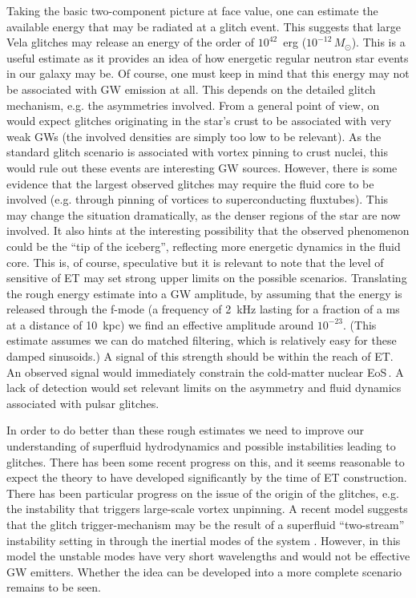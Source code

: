 Taking the basic two-component picture at face value,  one can estimate 
the available energy that may be radiated at a glitch event. This 
suggests that large Vela glitches may release an energy of the order 
of  $ 10^{42}$~erg ($10^{-12}\,M_\odot$). This is a useful estimate 
as it provides an idea of how energetic regular neutron star events in 
our galaxy may be.  Of course, one must keep in mind that this 
energy may not be associated with GW emission at all. This depends 
on the detailed glitch mechanism, e.g. the asymmetries involved. 
From a general point of view, on would expect glitches originating 
in the star's crust to be associated with very weak GWs (the involved 
densities are simply too low to be relevant). As the standard glitch 
scenario is associated with vortex pinning to crust nuclei, this 
would rule out these events are interesting GW sources. However, 
there is some evidence that the largest observed glitches may require 
the fluid core to be involved (e.g. through pinning of vortices to 
superconducting fluxtubes). This may change the situation dramatically, 
as the denser regions of the star are now involved. It also hints at 
the interesting possibility that the observed phenomenon could be the 
``tip of the iceberg'', reflecting more energetic dynamics in the 
fluid core. This is, of course, speculative but it is relevant to 
note that the level of sensitive of ET may set strong upper limits 
on the possible scenarios. Translating the rough energy estimate into 
a GW amplitude, by assuming that the energy is released through the 
f-mode (a frequency of 2~kHz lasting for a fraction of a ms at a 
distance of 10~kpc) we find an effective amplitude around 
$10^{-23}$. (This estimate assumes we can do matched filtering, which 
is relatively easy for these damped sinusoids.) A signal of this 
strength should be within the reach of ET.  An observed signal  
would immediately constrain the cold-matter nuclear 
EoS\,\cite{AnderssonKokkotas1998, Living:AnderssonComer}. A lack of 
detection would set relevant limits on the asymmetry and fluid 
dynamics associated with pulsar glitches.  

In order to do better than these rough estimates we need to improve 
our understanding of superfluid hydrodynamics and possible 
instabilities leading to glitches.  There has been some recent 
progress on this, and it seems reasonable to expect the theory to 
have developed significantly by the time of ET construction. There 
has been particular progress on the issue of the origin of the 
glitches, e.g. the instability that triggers large-scale vortex 
unpinning. A recent model suggests that the glitch trigger-mechanism 
may be the result of a superfluid  ``two-stream'' instability 
setting in through the inertial modes of the system 
\cite{Andersson:2002dv,Andersson:2002zd}. However, in this model 
the unstable modes have very short wavelengths and would not be 
effective GW emitters. Whether the idea can be developed into a 
more complete scenario remains to be seen.

